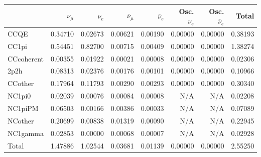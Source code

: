 \begin{tabular} { | l ||r | r | r | r | r | r | | r | }
\hline
              & $\nu_\mu$            & $\nu_e$              & $\bar{\nu}_{\mu}$    & $\bar{\nu}_{e}$      & Osc. $\nu_e$         & Osc. $\bar{\nu}_{e}$ & Total                \\ \hline\hline
 CCQE         & 0.34710              & 0.02673              & 0.00621              & 0.00190              & 0.00000              & 0.00000              & 0.38193              \\ \hline
 CC1pi        & 0.54451              & 0.82700              & 0.00715              & 0.00409              & 0.00000              & 0.00000              & 1.38274              \\ \hline
 CCcoherent   & 0.00355              & 0.01922              & 0.00021              & 0.00008              & 0.00000              & 0.00000              & 0.02306              \\ \hline
 2p2h         & 0.08313              & 0.02376              & 0.00176              & 0.00101              & 0.00000              & 0.00000              & 0.10966              \\ \hline
 CCother      & 0.17964              & 0.11793              & 0.00290              & 0.00293              & 0.00000              & 0.00000              & 0.30340              \\ \hline
 NC1pi0       & 0.02039              & 0.00076              & 0.00084              & 0.00008              & N/A                  & N/A                  & 0.02208              \\ \hline
 NC1piPM      & 0.06503              & 0.00166              & 0.00386              & 0.00033              & N/A                  & N/A                  & 0.07089              \\ \hline
 NCother      & 0.20699              & 0.00838              & 0.01319              & 0.00090              & N/A                  & N/A                  & 0.22945              \\ \hline
 NC1gamma     & 0.02853              & 0.00000              & 0.00068              & 0.00007              & N/A                  & N/A                  & 0.02928              \\ \hline
\hline
 Total        & 1.47886              & 1.02544              & 0.03681              & 0.01139              & 0.00000              & 0.00000              & 2.55250              \\ \hline

\end{tabular}
